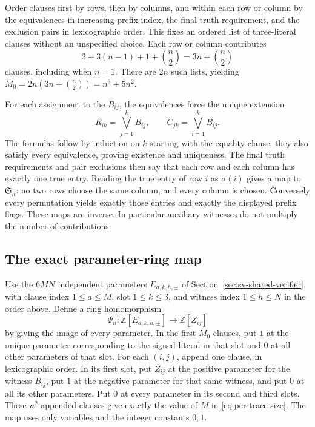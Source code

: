 Order clauses first by rows, then by columns, and within each row or
column by the equivalences in increasing prefix index, the final truth
requirement, and the exclusion pairs in lexicographic order. This fixes
an ordered list of three-literal clauses without an unspecified choice.
Each row or column contributes
\[
 2+3(n-1)+1+\binom n2=3n+\binom n2
\]
clauses, including when $n=1$. There are $2n$ such lists, yielding
$M_0=2n(3n+\binom n2)=n^3+5n^2$.

For each assignment to the $B_{ij}$, the equivalences force the unique
extension
\[
 R_{ik}=\bigvee_{j=1}^k B_{ij},\qquad
 C_{jk}=\bigvee_{i=1}^k B_{ij}.
\]
The formulas follow by induction on $k$ starting with the equality clause;
they also satisfy every equivalence, proving existence and uniqueness.
The final truth requirements and pair exclusions then say that each
row and each column has exactly one true entry. Reading the true entry
of row $i$ as $\sigma(i)$ gives a map to $\mathfrak S_n$: no two rows
choose the same column, and every column is chosen. Conversely every
permutation yields exactly those entries and exactly the displayed
prefix flags. These maps are inverse. In particular auxiliary witnesses
do not multiply the number of contributions.

\subsection{The exact parameter-ring map}

Use the $6MN$ independent parameters $E_{a,k,h,\pm}$ of
Section~\ref{sec:sv-shared-verifier}, with clause index $1\le a\le M$,
slot $1\le k\le3$, and witness index $1\le h\le N$ in the order above.
Define a ring homomorphism
\begin{equation}\label{eq:per-trace-parameter-map}
 \Psi_n:\mathbb Z[E_{a,k,h,\pm}]
       \longrightarrow\mathbb Z[Z_{ij}]
\end{equation}
by giving the image of every parameter. In the first $M_0$ clauses,
put $1$ at the unique parameter corresponding to the signed literal
in that slot and $0$ at all other parameters of that slot. For each
$(i,j)$, append one clause, in lexicographic order. In its first slot,
put $Z_{ij}$ at the positive parameter for the witness $B_{ij}$,
put $1$ at the negative parameter for that same witness, and put $0$
at all its other parameters. Put $0$ at every parameter in its
second and third slots. These $n^2$ appended clauses give exactly
the value of $M$ in \eqref{eq:per-trace-size}. The map uses only
variables and the integer constants $0,1$.

